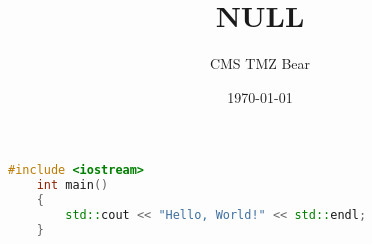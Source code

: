 \documentclass[UTF8]{ctexart}
\title{NULL}
\author{CMS TMZ Bear}
\date{\today}
\begin{document}
\maketitle
\begin{lstlisting}[language=c++]
    #include <iostream>
    int main()
    {
        std::cout << "Hello, World!" << std::endl;
    }  
\end{lstlisting}
\end{document}
